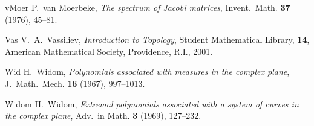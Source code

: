 \documentclass[reqno,centertags, 12pt]{amsart}
\numberwithin{equation}{section}
\theoremstyle{definition}
\begin{document}
\begin{thebibliography}{999}
{\bibitem}{vMoer} P.~van Moerbeke, {\it The spectrum of Jacobi matrices},
Invent.\ Math. {\bf 37} (1976),  45--81.

{\bibitem}{Vas} V.~A.~Vassiliev, \textit{Introduction to Topology}, Student
Mathematical Library, {\bf 14}, American Mathematical Society,
Providence, R.I., 2001.

{\bibitem}{Wid} H.~Widom, {\it Polynomials associated with measures in the
complex plane}, J.\ Math.\ Mech. {\bf 16} (1967), 997--1013.

{\bibitem}{Widom} H.~Widom, \emph{Extremal polynomials associated with a
system of curves in the complex plane}, Adv.\ in Math. {\bf 3}
(1969), 127--232.

\end{thebibliography}
\end{document}
